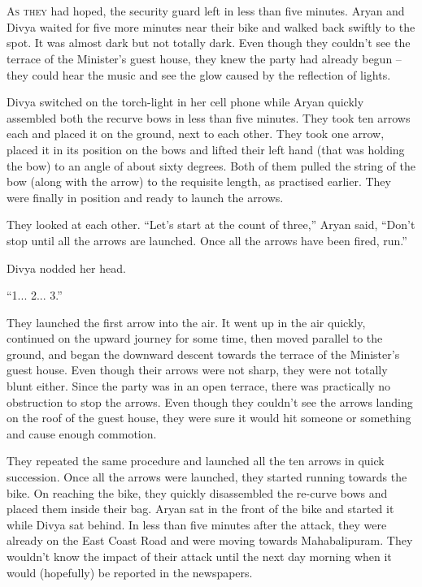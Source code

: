 \chapter{}

\lettrine{A}{s they} had hoped, the security guard left in less than five minutes. Aryan and
Divya waited for five more minutes near their bike and walked back swiftly to
the spot. It was almost dark but not totally dark. Even though they couldn't see
the terrace of the Minister's guest house, they knew the party had already begun
– they could hear the music and see the glow caused by the reflection of lights.


Divya switched on the torch-light in her cell phone while Aryan quickly
assembled both the recurve bows in less than five minutes. They took ten arrows
each and placed it on the ground, next to each other. They took one arrow,
placed it in its position on the bows and lifted their left hand (that was
holding the bow) to an angle of about sixty degrees. Both of them pulled the
string of the bow (along with the arrow) to the requisite length, as practised
earlier. They were finally in position and ready to launch the arrows.

They looked at each other. “Let's start at the count of three,” Aryan said,
“Don't stop until all the arrows are launched. Once all the arrows have been
fired, run.”

Divya nodded her head.

“1... 2... 3.”

They launched the first arrow into the air. It went up in the air quickly,
continued on the upward journey for some time, then moved parallel to the ground,
and began the downward descent towards the terrace of the Minister's guest
house. Even though their arrows were not sharp, they were not totally blunt
either. Since the party was in an open terrace, there was practically no
obstruction to stop the arrows. Even though they couldn't see the arrows landing
on the roof of the guest house, they were sure it would hit someone or something
and cause enough commotion.

They repeated the same procedure and launched all the ten arrows in quick
succession. Once all the arrows were launched, they started running towards the
bike. On reaching the bike, they quickly disassembled the re-curve bows and
placed them inside their bag. Aryan sat in the front of the bike and started it
while Divya sat behind. In less than five minutes after the attack, they were
already on the East Coast Road and were moving towards Mahabalipuram. They
wouldn't know the impact of their attack until the next day morning when it
would (hopefully) be reported in the newspapers.

